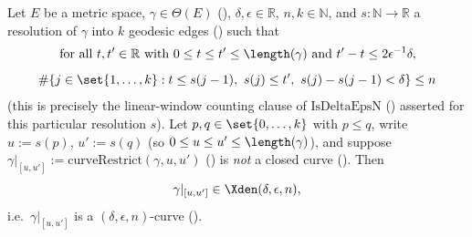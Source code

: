 \begin{lemma}
  Let $E$ be a metric space, $\gamma \in \Theta(E)$ (), $\delta,\epsilon \in
  \mathbb{R}$, $n,k \in \mathbb{N}$, and $s \colon \mathbb{N} \to \mathbb{R}$ a resolution of
  $\gamma$ into $k$ geodesic edges () such that
  \[
    \text{for all } t,t' \in \mathbb{R} \text{ with } 0 \le t \le t' \le \length(\gamma)
    \text{ and } t'-t \le 2\epsilon^{-1}\delta,
  \]
  \[
    \#\{ j \in \set{1,\dots,k} : t \le s(j-1),\ s(j) \le t',\ s(j)-s(j-1) < \delta \} \le n
  \]
  (this is precisely the linear-window counting clause of $\mathrm{IsDeltaEpsN}$
  () asserted for this particular resolution $s$). Let $p,q \in
  \set{0,\dots,k}$ with $p \le q$, write $u := s(p)$, $u' := s(q)$ (so $0 \le u \le u' \le
  \length(\gamma)$), and suppose $\gamma|_{[u,u']} := \mathrm{curveRestrict}(\gamma,u,u')$
  () is \emph{not} a closed curve (). Then
  \[
    \gamma|_{[u,u']} \in \Xden(\delta,\epsilon,n)
    ,
  \]
  i.e.\ $\gamma|_{[u,u']}$ is a $(\delta,\epsilon,n)$-curve ().


\end{lemma}

